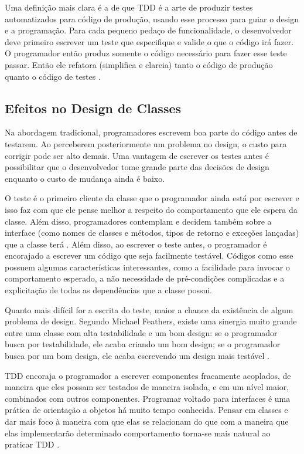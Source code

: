 Uma definição mais clara é a de que TDD é a arte de produzir testes
automatizados para código de produção, usando esse processo para guiar o design e a programação.
Para cada pequeno pedaço de funcionalidade, o desenvolvedor deve primeiro
escrever um teste que especifique e valide o que o código irá fazer. O
programador então produz somente o código necessário para fazer esse teste
passar. Então ele refatora (simplifica e clareia) tanto o código de produção
quanto o código de testes \cite{agilealliance-tdd} \cite{tdd-taxonomy}.

\subsection{Efeitos no Design de Classes}

Na abordagem tradicional, programadores escrevem boa parte do código antes de
testarem. Ao perceberem posteriormente um problema no design, o custo para
corrigir pode ser alto demais. Uma vantagem de escrever os testes antes é
possibilitar que o desenvolvedor tome grande parte das decisões de design
enquanto o custo de mudança ainda é baixo.

O teste é o primeiro cliente da
classe que o programador ainda está por escrever e isso faz com que ele pense
melhor a respeito do comportamento que ele espera da classe. Além disso,
programadores contemplam e decidem também sobre a interface (como nomes de
classes e métodos, tipos de retorno e exceções lançadas) que a classe terá
\cite{janzen-saiedian}.
Além disso, ao escrever o teste antes, o programador é encorajado a escrever um
código que seja facilmente testável. Códigos como esse possuem algumas
características interessantes, como a facilidade para invocar o comportamento
esperado, a não necessidade de pré-condições complicadas e a explicitação de
todas as dependências que a classe possui.

Quanto mais difícil for a escrita do teste, maior a chance da existência de
algum problema de design. Segundo Michael Feathers, existe uma sinergia muito
grande entre uma classe com alta testabilidade e um bom design: se o
programador busca por testabilidade, ele acaba criando um bom design; se o
programador busca por um bom design, ele acaba escrevendo um design mais
testável \cite{feathers-synergy}.

TDD encoraja o programador a escrever componentes fracamente acoplados, de
maneira que eles possam ser testados de maneira isolada, e em um nível maior,
combinados com outros componentes.
Programar voltado para interfaces é uma prática de orientação a objetos há muito
tempo conhecida. Pensar em classes e dar mais foco à maneira com que
elas se relacionam do que com a maneira que elas implementarão determinado
comportamento torna-se mais natural ao praticar TDD \cite{GOOS}. 

